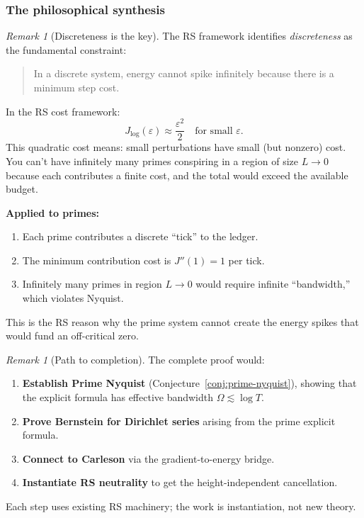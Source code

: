 \documentclass[11pt]{article}
\theoremstyle{definition}
\theoremstyle{remark}
\newtheorem{remark}[theorem]{Remark}
\theoremstyle{definition}
\begin{document}
\subsubsection*{The philosophical synthesis}

\begin{remark}[Discreteness is the key]
The RS framework identifies \emph{discreteness} as the fundamental constraint:
\begin{quote}
In a discrete system, energy cannot spike infinitely because there is a minimum step cost.
\end{quote}

In the RS cost framework:
\[
  J_{\log}(\varepsilon) \approx \frac{\varepsilon^2}{2} \quad \text{for small } \varepsilon.
\]
This quadratic cost means: small perturbations have small (but nonzero) cost. You can't have infinitely many primes conspiring in a region of size $L \to 0$ because each contributes a finite cost, and the total would exceed the available budget.

\textbf{Applied to primes:}
\begin{enumerate}
\item Each prime contributes a discrete ``tick'' to the ledger.
\item The minimum contribution cost is $J''(1) = 1$ per tick.
\item Infinitely many primes in region $L \to 0$ would require infinite ``bandwidth,'' which violates Nyquist.
\end{enumerate}

This is the RS reason why the prime system cannot create the energy spikes that would fund an off-critical zero.
\end{remark}

\begin{remark}[Path to completion]
The complete proof would:
\begin{enumerate}
\item \textbf{Establish Prime Nyquist} (Conjecture~\ref{conj:prime-nyquist}), showing that the explicit formula has effective bandwidth $\Omega \lesssim \log T$.
\item \textbf{Prove Bernstein for Dirichlet series} arising from the prime explicit formula.
\item \textbf{Connect to Carleson} via the gradient-to-energy bridge.
\item \textbf{Instantiate RS neutrality} to get the height-independent cancellation.
\end{enumerate}
Each step uses existing RS machinery; the work is instantiation, not new theory.
\end{remark}
\end{document}
